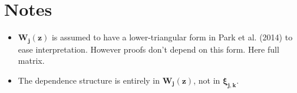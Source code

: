 \documentclass{article}
\newcommand{\increment}[2]{\bm{\xi_{#1,#2}}}
\begin{document}
	\section{Notes}
		\begin{itemize}
			\item  $\bm{W_{j}(z)}$ is assumed to have a lower-triangular form in Park et al. (2014) to ease interpretation. However proofs don't depend on this form. Here full matrix. 
			\item The dependence structure is entirely in $\bm{W_{j}(z)}$, not in $\increment{j}{k}$.
		\end{itemize}











	
\end{document}
